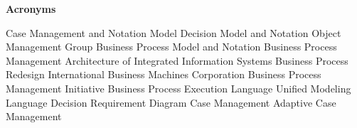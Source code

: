 \clearemptydoublepage
{}
{}	




\vspace*{2cm}

\begin{center}
{\Large \bf Acronyms}
\end{center}
\vspace{1cm}

\begin{acronym}[bash]
 {Case Management and Notation Model}
 {Decision Model and Notation}
 {Object Management Group}
 {Business Process Model and Notation}
 {Business Process Management}
 {Architecture of Integrated Information Systems}
 {Business Process Redesign} 
 {International Business Machines Corporation}
 {Business Process Management Initiative}
 {Business Process Execution Language}
 {Unified Modeling Language}
 {Decision Requirement Diagram}
 {Case Management}
 {Adaptive Case Management}
\end{acronym}
